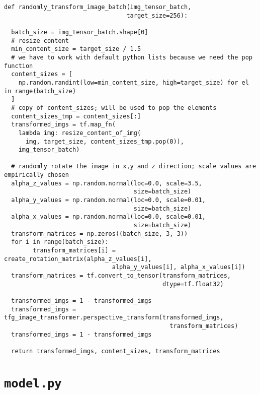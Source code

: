 \begin{code}
  \begin{verbatim}
def randomly_transform_image_batch(img_tensor_batch, 
                                  target_size=256):

  batch_size = img_tensor_batch.shape[0]
  # resize content
  min_content_size = target_size / 1.5
  # we have to work with default python lists because we need the pop function
  content_sizes = [
    np.random.randint(low=min_content_size, high=target_size) for el in range(batch_size)
  ]
  # copy of content_sizes; will be used to pop the elements
  content_sizes_tmp = content_sizes[:]
  transformed_imgs = tf.map_fn(
    lambda img: resize_content_of_img(
      img, target_size, content_sizes_tmp.pop(0)), 
    img_tensor_batch)

  # randomly rotate the image in x,y and z direction; scale values are empirically chosen
  alpha_z_values = np.random.normal(loc=0.0, scale=3.5, 
                                    size=batch_size)
  alpha_y_values = np.random.normal(loc=0.0, scale=0.01, 
                                    size=batch_size)
  alpha_x_values = np.random.normal(loc=0.0, scale=0.01, 
                                    size=batch_size)
  transform_matrices = np.zeros((batch_size, 3, 3))
  for i in range(batch_size):
        transform_matrices[i] = create_rotation_matrix(alpha_z_values[i],
                              alpha_y_values[i], alpha_x_values[i])
  transform_matrices = tf.convert_to_tensor(transform_matrices, 
                                            dtype=tf.float32)

  transformed_imgs = 1 - transformed_imgs
  transformed_imgs = tfg_image_transformer.perspective_transform(transformed_imgs,
                                              transform_matrices)
  transformed_imgs = 1 - transformed_imgs

  return transformed_imgs, content_sizes, transform_matrices
\end{verbatim}
  \label{lst:pictogram-augmentation}
  \end{code}

\section*{\lstinline{model.py}}

